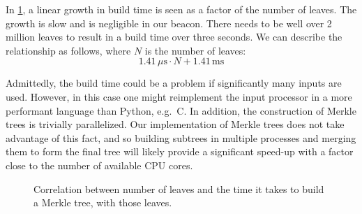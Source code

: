 In \cref{fig:merkle_build}, a linear growth in build time is seen as a factor of the number of leaves.
The growth is slow and is negligible in our beacon. There needs to be well over 2 million leaves to result in a build time over three seconds.
We can describe the relationship as follows, where $N$ is the number of leaves:
$$
1.41\,\mu\text{s} \cdot N + 1.41\,\text{ms}
$$

Admittedly, the build time could be a problem if significantly many inputs are used.
However, in this case one might reimplement the input processor in a more performant language than Python, e.g.\ C.
In addition, the construction of Merkle trees is trivially parallelized.
Our implementation of Merkle trees does not take advantage of this fact, and so building subtrees in multiple processes and merging them to form the final tree will likely provide a significant speed-up with a factor close to the number of available CPU cores.

\begin{figure}
    \centering\footnotesize
    \caption{Correlation between number of leaves and the time it takes to build a Merkle tree, with those leaves.}%
    \label{fig:merkle_build}
\end{figure}

